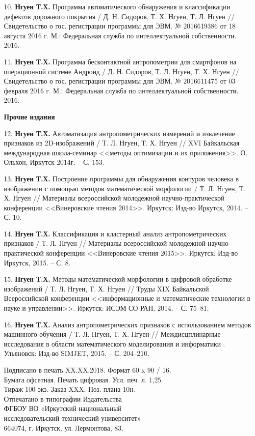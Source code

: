 10. \textbf{Нгуен Т.Х.} Программа автоматического обнаружения и классификации дефектов дорожного покрытия / Д. Н. Сидоров, Т. Х. Нгуен, Т. Л. Нгуен // Свидетельство о гос. регистрации программы для ЭВМ. № 2016619386 от 18 августа 2016 г. М.: Федеральная служба по интеллектуальной собственности. 2016.

11. \textbf{Нгуен Т.Х.} Программа бесконтактной антропометрии для смартфонов на операционной системе Андроид / Д. Н. Сидоров, Т. Л. Нгуен, Т. Х. Нгуен // Свидетельство о гос. регистрации программы для ЭВМ. № 2016611475 от 03 февраля 2016 г. М.: Федеральная служба по интеллектуальной собственности. 2016.

	\hspace{-1.5cm}\textbf{Прочие издания}

12. \textbf{Нгуен Т.Х.} Автоматизация антропометрических измерений и извлечение признаков из 2D-изображений / Т. Л. Нгуен, Т. Х. Нгуен // XVI Байкальская международная школа-семинар <<методы оптимизации и их приложения>>. О. Ольхон, Иркутск 2014г. -- С. 153.

13. \textbf{Нгуен Т.Х.} Построение программы для обнаружения контуров человека в изображении с помощью методов математической морфологии / Т. Л. Нгуен, Т. Х. Нгуен // Материалы всероссийской молодежной научно-практической конференции <<Винеровские чтения 2014>>. Иркутск: Изд-во Иркутск, 2014. -- С. 10.

14. \textbf{Нгуен Т.Х.} Классификация и кластерный анализ антропометрических признаков / Т. Л. Нгуен // Материалы всероссийской молодежной научно-практической конференции <<Винеровские чтения 2015>>. Иркутск: Изд-во Иркутск, 2015. -- С. 8.

15. \textbf{Нгуен Т.Х.} Методы математической морфологии в цифровой обработке изображений / Т. Л. Нгуен, Т. Х. Нгуен // Труды XIX Байкальской Всероссийской конференции <<информационные и математические технологии в науке и управлении>>. Иркутск: ИСЭМ СО РАН, 2014. -- С. 75--81.

16. \textbf{Нгуен Т.Х.} Анализ антропометрических признаков с использованием методов машинного обучения / Т. Л. Нгуен, Т. Х. Нгуен // Междисцплинарные исследования в области математического моделирования и информатики . Ульяновск: Изд-во SIMJET, 2015. -- С. 204--210.

\begin{center}
\vspace{0.6cm}
Подписано в печать XX.XX.2018. Формат 60 x 90 / 16.\\
Бумага офсетная. Печать цифровая. Усл. печ. л. 1,25.\\
Тираж 100 экз. Заказ XXX. Поз. плана 10н.\\
\vspace{0.6cm}
Отпечатано в типографии Издательства\\
ФГБОУ ВО «Иркутский национальный\\
исследовательский технический университет»\\
664074, г. Иркутск, ул. Лермонтова, 83.
\end{center}
\thispagestyle{empty}
